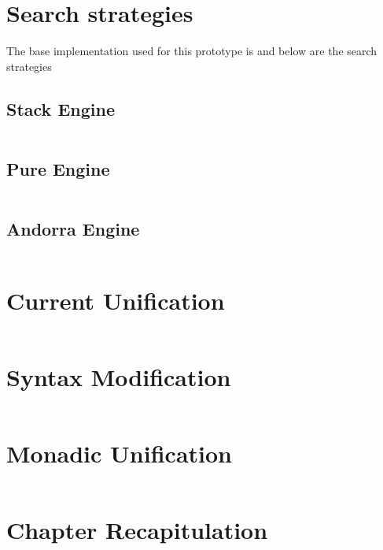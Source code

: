 \documentclass[thesis-solanki.tex]{files}
\begin{document}
\section{Search strategies}
The base implementation used for this prototype  is \cite{website:mini-prolog-hugs98} and below are the search
strategies
\subsection{Stack Engine}
\begin{singlespace}
\inputminted[linenos]{haskell}{haskell-proto3-sudsy-woe.hs}
\end{singlespace}

\subsection{Pure Engine}
\begin{singlespace}
\inputminted[linenos]{haskell}{haskell-proto3-absurd-silicon.hs}
\end{singlespace}

\subsection{Andorra Engine}
\begin{singlespace}
\inputminted[linenos]{haskell}{haskell-proto3-diatomic-unbank.hs}
\end{singlespace}

\section{Current Unification}
\begin{singlespace}
  \inputminted[linenos]{haskell}{haskell-proto3-pentyl-skater.hs}
\end{singlespace}


\section{Syntax Modification}
\begin{singlespace}
  \inputminted[linenos]{haskell}{haskell-proto3-uplift-apart.hs}
\end{singlespace}

\section{Monadic Unification}
\begin{singlespace}
  \inputminted[linenos]{haskell}{haskell-proto3-bevy-icebox.hs}
\end{singlespace}


\section{Chapter Recapitulation}
\end{document}
